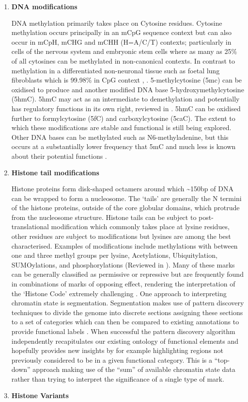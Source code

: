 \documentclass[
]{book}
\begin{document}
\begin{enumerate}
\def\labelenumi{\arabic{enumi}.}
\item
  \textbf{DNA modifications}

  DNA methylation primarily takes place on Cytosine residues. Cytosine methylation occurs principally in an mCpG sequence context but can also occur in mCpH, mCHG and mCHH (H=A/C/T) contexts; particularly in cells of the nervous system \citep{Guo2014a} and embryonic stem cells where as many as 25\% of all cytosines can be methylated in non-canonical contexts. In contrast to methylation in a differentiated non-neuronal tissue such as foetal lung fibroblasts which is 99.98\% in CpG context \citep{Lister2009}, \citep{Schultz2015}. 5-methylcytosine (5mc) can be oxidised to produce and another modified DNA base 5-hydroxymethylcytosine (5hmC). 5hmC may act as an intermediate to demethylation and potentially has regulatory functions in its own right, reviewed in \citep{Pfeifer2013}. 5hmC can be oxidised further to formylcytosine (5fC) and carboxylcytosine (5caC). The extent to which these modifications are stable and functional is still being explored. Other DNA bases can be methylated such as N6-methyladenine, but this occurs at a substantially lower frequency that 5mC and much less is known about their potential functions \citep{Wu2016}.
\item
  \textbf{Histone tail modifications}

  Histone proteins form disk-shaped octamers around which \textasciitilde150bp of DNA can be wrapped to form a nucleosome. The `tails' are generally the N termini of the histone proteins, outside of the core globular domains, which protrude from the nucleosome structure. Histone tails can be subject to post-translational modification which commonly takes place at lysine residues, other residues are subject to modifications but lysines are among the best characterised. Examples of modifications include methylations with between one and three methyl groups per lysine, Acetylations, Ubiquitylation, SUMOylations, and phosphorylations (Reviewed in \citet{Bannister2011}). Many of these marks can be generally classified as permissive or repressive but are frequently found in combinations of marks of opposing effect, rendering the interpretation of the `Histone Code' extremely challenging \citep{Voigt2012}. One approach to interpreting chromatin state is segmentation. Segmentation makes use of pattern discovery techniques to divide the genome into discrete sections assigning these sections to a set of categories which can then be compared to existing annotations to provide functional labels \citep[\citet{Carrillo-de-Santa-Pau2017}]{Hoffman2012}. When successful the pattern discovery algorithm independently recapitulates our existing ontology of functional elements and hopefully provides new insights by for example highlighting regions not previously considered to be in a given functional category. This is a ``top-down'' approach making use of the ``sum'' of available chromatin state data rather than trying to interpret the significance of a single type of mark.
\item
  \textbf{Histone Variants}


\end{enumerate}
\end{document}
